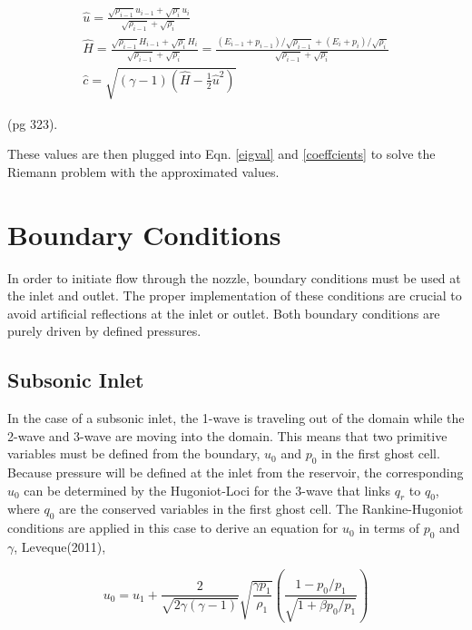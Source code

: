\documentclass{article}%
\numberwithin{equation}{section}
\begin{document}
\begin{equation}
\begin{split}
\hat{u}= \frac{\sqrt{\rho_{i - 1}} u_{i-1} + \sqrt{\rho_i} u_i}{\sqrt{\rho_{i-1}} + \sqrt{\rho_i}}  \\
\hat{H} = \frac{\sqrt{\rho_{i - 1}} H_{i-1} + \sqrt{\rho_i} H_i}{\sqrt{\rho_{i-1}} + \sqrt{\rho_i}} = \frac{(E_{i-1} + p_{i-1})/\sqrt{\rho_{i - 1}}+ (E_i + p_i) / \sqrt{\rho_i} }{\sqrt{\rho_{i-1}} + \sqrt{\rho_i}} \\
\hat{c} = \sqrt{(\gamma - 1) \left( \hat{H} - \frac{1}{2} \hat{u}^2 \right)}
\end{split}
\end{equation}

(pg 323).

These values are then plugged into Eqn. \ref{eigval} and \ref{coeffcients} to solve the Riemann problem with the approximated values.

\section{Boundary Conditions}
In order to initiate flow through the nozzle, boundary conditions must be used at the inlet and outlet. The proper implementation of these conditions are crucial to avoid artificial reflections at the inlet or outlet. Both boundary conditions are purely driven by defined pressures.

\subsection{Subsonic Inlet}
In the case of a subsonic inlet, the 1-wave is traveling out of the domain while the 2-wave and 3-wave are moving into the domain. This means that two primitive variables must be defined from the boundary, $u_0$ and $p_0$ in the first ghost cell. Because pressure will be defined at the inlet from the reservoir, the corresponding $u_0$ can be determined by the Hugoniot-Loci for the 3-wave that links $q_r$ to $q_0$, where $q_0$ are the conserved variables in the first ghost cell. The Rankine-Hugoniot conditions are applied in this case to derive an equation for $u_0$ in terms of $p_0$ and $\gamma$, Leveque(2011),

\begin{equation}
u_0 = u_1 + \frac{2}{\sqrt{2 \gamma (\gamma - 1)}} \sqrt{\frac{\gamma p_1}{\rho_1}} \left( \frac{1 - p_0 / p_1}{\sqrt{1 + \beta p_0 / p_1}} \right)
\end{equation}
\end{document}
